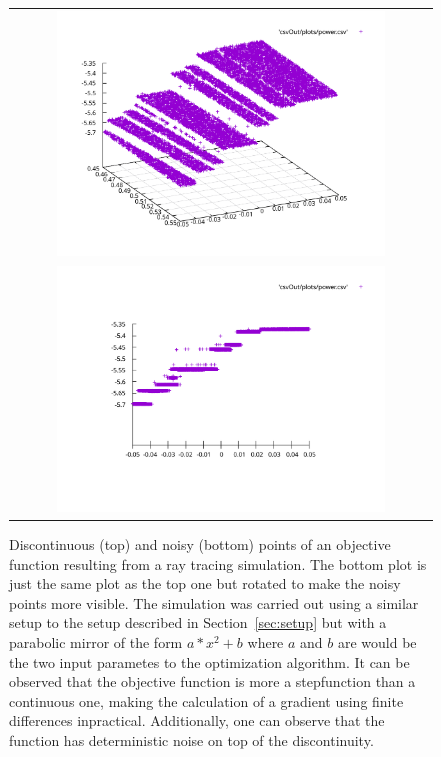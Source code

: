 \documentclass[a4paper,10pt]{article}
\newcommand{\secref}[1]{Section~\ref{#1}}
\begin{document}
    \begin{figure}
        \centering
        \begin{tabular}{c}
        \includegraphics[width=0.8\textwidth]{images/discontinuity.pdf} \\
        \includegraphics[width=0.8\textwidth]{images/noisyness.pdf}
        \end{tabular}
        \caption[Discontinuity and noisyness of the objective function]{
            Discontinuous (top) and noisy (bottom) points of an objective function
            resulting from a ray tracing simulation.
            The bottom plot is just the same plot as the top one but rotated
            to make the noisy points more visible.
            The simulation was carried out using a similar setup to the setup described
            in \secref{sec:setup} but with a parabolic mirror of the form
            $a*x^2 + b$ where $a$ and $b$ are would be the two input
            parametes to the optimization algorithm.
            It can be observed that the objective function is more a stepfunction than
            a continuous one, making the calculation of a gradient using
            finite differences inpractical.
            Additionally, one can observe that the function has deterministic noise 
            on top of the discontinuity.
        }
        \label{fig:opt_discontinuous}
    \end{figure}
\end{document}
